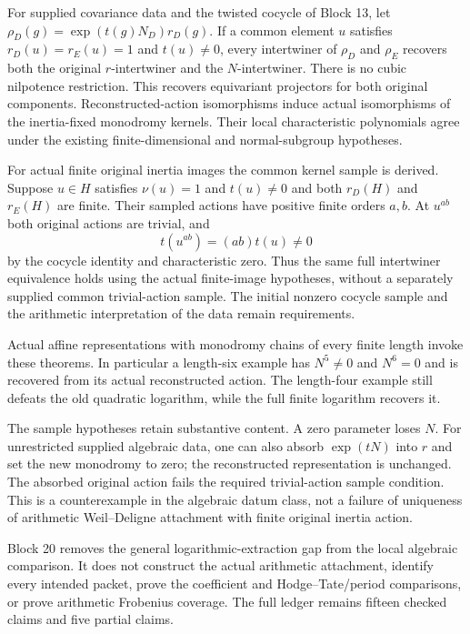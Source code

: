\documentclass[11pt]{article}
\theoremstyle{definition}
\theoremstyle{remark}
\begin{document}
For supplied covariance data and the twisted cocycle of Block 13, let
$\rho_D(g)=\exp(t(g)N_D)r_D(g)$. If a common element $u$ satisfies
$r_D(u)=r_E(u)=1$ and $t(u)\ne0$, every intertwiner of $\rho_D$ and
$\rho_E$ recovers both the original $r$-intertwiner and the $N$-intertwiner.
There is no cubic nilpotence restriction. This recovers equivariant
projectors for both original components. Reconstructed-action isomorphisms
induce actual isomorphisms of the inertia-fixed monodromy kernels. Their local characteristic polynomials
agree under the existing finite-dimensional and normal-subgroup hypotheses.

For actual finite original inertia images the common kernel sample is
derived. Suppose $u\in H$ satisfies $\nu(u)=1$ and $t(u)\ne0$ and both
$r_D(H)$ and $r_E(H)$ are finite. Their sampled actions have positive
finite orders $a,b$. At $u^{ab}$ both original actions are trivial, and
\[
t(u^{ab})=(ab)t(u)\ne0
\]
by the cocycle identity and characteristic zero. Thus the same full
intertwiner equivalence holds using the actual finite-image hypotheses,
without a separately supplied common trivial-action sample. The initial
nonzero cocycle sample and the arithmetic interpretation of the data
remain requirements.

Actual affine representations with monodromy chains of every finite
length invoke these theorems. In particular a length-six example has
$N^5\ne0$ and $N^6=0$ and is recovered from its actual reconstructed action.
The length-four example still defeats the old quadratic logarithm, while
the full finite logarithm recovers it.

The sample hypotheses retain substantive content. A zero parameter loses
$N$. For unrestricted supplied algebraic data, one can also absorb
$\exp(tN)$ into $r$ and set the new monodromy to zero; the reconstructed
representation is unchanged. The absorbed original action fails the
required trivial-action sample condition. This is a counterexample in the
algebraic datum class, not a failure of uniqueness of arithmetic
Weil--Deligne attachment with finite original inertia action.

Block 20 removes the general logarithmic-extraction gap from the local
algebraic comparison. It does not construct the actual arithmetic
attachment, identify every intended packet, prove the coefficient and
Hodge--Tate/period comparisons, or prove arithmetic Frobenius coverage.
The full ledger remains fifteen checked claims and five partial claims.
\end{document}
